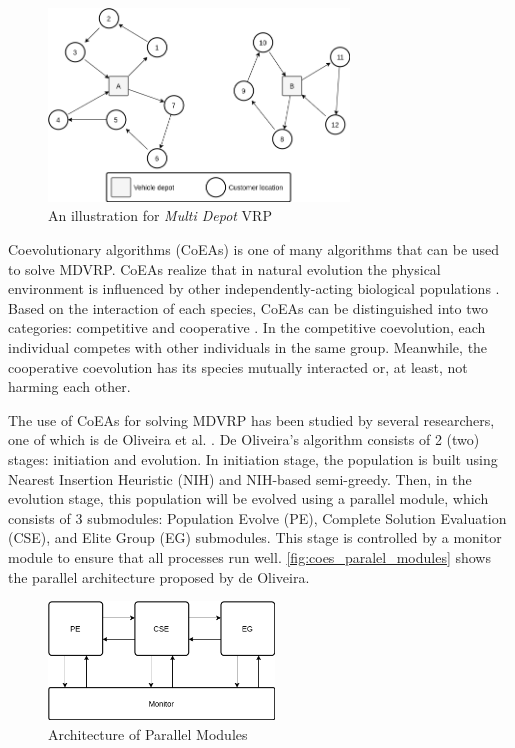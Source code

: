 \documentclass[conference]{IEEEtran}
\begin{document}
\begin{figure}[!]
	\centering
	\includegraphics[width=8cm]{Resources/Images/mdvrp-illustration}
	\caption{An illustration for \textit{Multi Depot} VRP}
	\label{fig:mdvrp-illustration}
\end{figure}

Coevolutionary algorithms (CoEAs) is one of many algorithms \cite{cordeau_tabu_1997} \cite{pisinger_general_2007} \cite{lau_application_2010} \cite{cordeau_parallel_2012} \cite{subramanian_hybrid_2013} \cite{vidal_implicit_2014} \cite{escobar_hybrid_2014} \cite{de_oliveira_cooperative_2016} that can be used to solve MDVRP. CoEAs realize that in natural evolution the physical environment is influenced by other independently-acting biological populations \cite{engelbrecht_coevolution_2007}. Based on the interaction of each species, CoEAs can be distinguished into two categories: competitive and cooperative \cite{engelbrecht_coevolution_2007}. In the competitive coevolution, each individual competes with other individuals in the same group. Meanwhile, the cooperative coevolution has its species mutually interacted or, at least, not harming each other.

The use of CoEAs for solving MDVRP has been studied by several researchers, one of which is de Oliveira et al. \cite{de_oliveira_cooperative_2016}. De Oliveira's algorithm consists of 2 (two) stages: initiation and evolution. In initiation stage, the population is built using Nearest Insertion Heuristic (NIH) and NIH-based semi-greedy. Then, in the evolution stage, this population will be evolved using a parallel module, which consists of 3 submodules: Population Evolve (PE), Complete Solution Evaluation (CSE), and Elite Group (EG) submodules. This stage is controlled by a monitor module to ensure that all processes run well. \autoref{fig:coes_paralel_modules} shows the parallel architecture proposed by de Oliveira.


\begin{figure}[!]
	\centering
	\includegraphics[width=6cm]{Resources/Images/coes_paralel_modules}
	\caption{Architecture of Parallel Modules \cite{de_oliveira_cooperative_2016}}
	\label{fig:coes_paralel_modules}
\end{figure}
\end{document}
